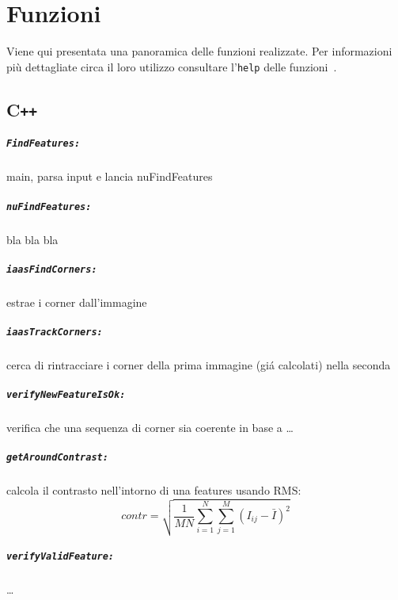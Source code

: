 \documentclass[12pt]{report}
\begin{document}
\chapter{Funzioni}

Viene qui presentata una panoramica delle funzioni realizzate. Per informazioni pi\`u dettagliate circa il loro utilizzo consultare l'\verb|help| delle funzioni~\cite{lucaskanade81}.

\section[C++]{C\verb_++_}

\paragraph*{\verb_FindFeatures:_} main, parsa input e lancia nuFindFeatures

\paragraph*{\verb_nuFindFeatures:_} bla bla bla

\paragraph*{\verb_iaasFindCorners:_} estrae i corner dall'immagine

\paragraph*{\verb_iaasTrackCorners:_} cerca di rintracciare i corner della prima immagine (gi\'a calcolati) nella seconda

\paragraph*{\verb_verifyNewFeatureIsOk:_} verifica che una sequenza di corner sia coerente in base a \dots

\paragraph*{\verb_getAroundContrast:_} calcola il contrasto nell'intorno di una features usando RMS: $$contr = \sqrt{\frac{1}{MN}\sum_{i=1}^N\sum_{j=1}^M(I_{ij}-\bar{I})^2}$$

\paragraph*{\verb_verifyValidFeature:_} \dots
\end{document}
